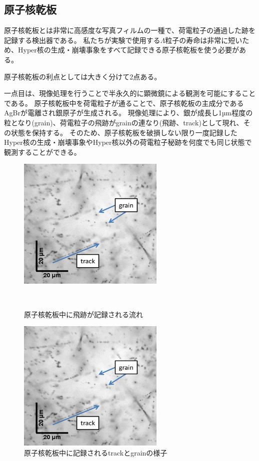 \documentclass[12pt,a4paper]{jarticle}
\begin{document}
\subsection{原子核乾板}
原子核乾板とは非常に高感度な写真フィルムの一種で、荷電粒子の通過した跡を記録する検出器である。
私たちが実験で使用する$\Lambda$粒子の寿命は非常に短いため、Hyper核の生成・崩壊事象をすべて記録できる原子核乾板を使う必要がある。
\par
原子核乾板の利点としては大きく分けて2点ある。
\par
一点目は、現像処理を行うことで半永久的に顕微鏡による観測を可能にすることである。
原子核乾板中を荷電粒子が通ることで、原子核乾板の主成分であるAgBrが電離され銀原子が生成される。
現像処理により、銀が成長し1µm程度の粒となり(grain)、荷電粒子の飛跡がgrainの連なり(飛跡、track)として現れ、その状態を保持する。
そのため、原子核乾板を破損しない限り一度記録したHyper核の生成・崩壊事象やHyper核以外の荷電粒子秘跡を何度でも同じ状態で観測することができる。
\par
\begin{figure}[htbp]
    \begin{center}
     \includegraphics[width=70mm]{grainfog.png}
    \end{center}
　　\caption{原子核乾板中に飛跡が記録される流れ\label{fig:process_recored_track}}
\end{figure}
\begin{figure}[htbp]
 \begin{center}
  \includegraphics[width=70mm]{grainfog.png}
 \end{center}
 \caption{原子核乾板中に記録されるtrackとgrainの様子\label{fig:grain_track}}
\end{figure}
\end{document}
